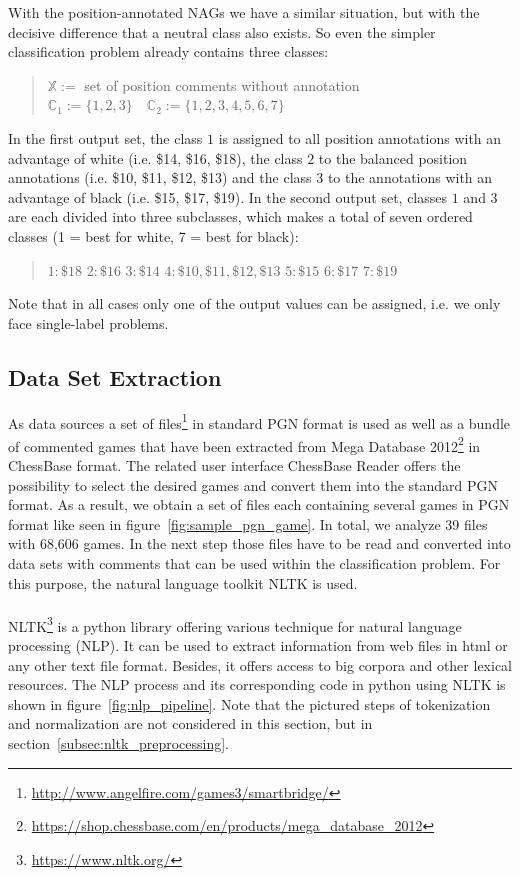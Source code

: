 \documentclass[article,type=msc,colorback,accentcolor=tud7b]{tudthesis}
\begin{document}
\begin{itemize}
      With the position-annotated NAGs we have a similar situation, but with the decisive difference that a neutral class also exists. So even the simpler classification problem already contains three classes:
      \begin{quotation}
        $\mathbb{X}:=$ set of position comments without annotation \quad $\mathbb{C}_{1}:=\{1,2,3\} \quad \mathbb{C}_{2}:=\{1,2,3,4,5,6,7\}$
      \end{quotation}
      In the first output set, the class $1$ is assigned to all position annotations with an advantage of white (i.e. \$14, \$16, \$18), the class $2$ to the balanced position annotations (i.e. \$10, \$11, \$12, \$13) and the class $3$ to the annotations with an advantage of black (i.e. \$15, \$17, \$19). In the second output set, classes $1$ and $3$ are each divided into three subclasses, which makes a total of seven ordered classes (1 = best for white, 7 = best for black):
      \begin{quotation}
        $1: \$18$ \quad $2: \$16$ \quad $3: \$14$ \quad $4: \$10,\$11,\$12,\$13$ \quad $5: \$15$ \quad $6: \$17$ \quad $7: \$19$
      \end{quotation}
    \end{itemize}
    Note that in all cases only one of the output values can be assigned, i.e. we only face single-label problems.
  
  \subsection{Data Set Extraction}
  \label{subsec:data_set_extraction}  
    As data sources a set of files\footnote{\url{http://www.angelfire.com/games3/smartbridge/}} in standard PGN format is used as well as a bundle of commented games that have been extracted from Mega Database 2012\footnote{\url{https://shop.chessbase.com/en/products/mega_database_2012}} in ChessBase format. The related user interface ChessBase Reader offers the possibility to select the desired games and convert them into the standard PGN format. As a result, we obtain a set of files each containing several games in PGN format like seen in figure~\ref{fig:sample_pgn_game}. In total, we analyze 39 files with 68,606 games. In the next step those files have to be read and converted into data sets with comments that can be used within the classification problem. For this purpose, the natural language toolkit NLTK is used. \\\\
    NLTK\footnote{\url{https://www.nltk.org/}} is a python library offering various technique for natural language processing (NLP). It can be used to extract information from web files in html or any other text file format. Besides, it offers access to big corpora and other lexical resources. The NLP process and its corresponding code in python using NLTK is shown in figure~\ref{fig:nlp_pipeline}. Note that the pictured steps of tokenization and normalization are not considered in this section, but in section~\ref{subsec:nltk_preprocessing}.
\end{document}
